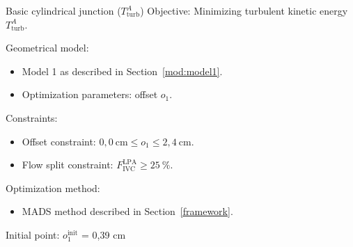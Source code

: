 

\begin{optimproblem}{Basic cylindrical junction ($T^{A}_{\mathrm{turb}}$)}
	\vspace{2mm}
	Objective: Minimizing turbulent kinetic energy $T^{A}_{\mathrm{turb}}$.
	
	\vspace{2mm}
	Geometrical model:
	\begin{itemize}
		\item Model 1 as described in Section~\ref{mod:model1}.
		\item Optimization parameters: offset $o_1$.
	\end{itemize}
	Constraints:
	\begin{itemize}
		\item Offset constraint: $0{,}0~\text{cm} \leq o_1 \leq 2{,}4~\text{cm}$.
		\item Flow split constraint: $F^{\text{LPA}}_{\text{IVC}} \geq 25~\%$.
	\end{itemize}
	Optimization method:
	\begin{itemize}
		\item MADS method described in Section~\ref{framework}.
	\end{itemize}
	Initial point: $o^{\text{init}}_{1}$ = 0{,}39 cm
	\label{optimprob:4}
\end{optimproblem}


